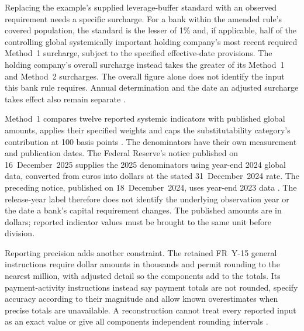 Replacing the example's supplied leverage-buffer standard with an observed
requirement needs a specific surcharge. For a bank within the amended rule's
covered population, the standard is the lesser of 1\% and, if applicable,
half of the controlling global systemically important holding company's most
recent required Method~1 surcharge, subject to the specified effective-date
provisions. The holding company's overall surcharge instead takes the greater
of its Method~1 and Method~2 surcharges. The overall figure alone does not
identify the input this bank rule requires.
Annual determination and the date an adjusted surcharge takes effect also
remain separate
\citep[12~CFR~3.11(a)(1)(v)]{occcapitalpayout2026}
\citep[12~CFR~217.403(a)--(d)]{fedgsibsurcharge2026}.

Method~1 compares twelve reported systemic indicators with published global
amounts, applies their specified weights and caps the substitutability
category's contribution at 100 basis points
\citep[12~CFR~217.404]{fedgsibscore2026}.
The denominators have their own measurement and publication dates. The
Federal Reserve's notice published on 16~December~2025 supplies the 2025
denominators using year-end 2024 global data, converted from euros into
dollars at the stated 31~December~2024 rate. The preceding notice, published
on 18~December~2024, uses year-end 2023 data
\citep[pp.~58245--58246]{fedgsibdenominators2025}
\citep[pp.~102908--102909]{fedgsibdenominators2024}.
The release-year label therefore does not identify the underlying observation
year or the date a bank's capital requirement changes. The published amounts
are in dollars; reported indicator values must be brought to the same unit
before division.

Reporting precision adds another constraint. The retained FR~Y-15 general
instructions require dollar amounts in thousands and permit rounding to the
nearest million, with adjusted detail so the components add to the totals.
Its payment-activity instructions instead say payment totals are not rounded,
specify accuracy according to their magnitude and allow known overestimates
when precise totals are unavailable. A reconstruction cannot treat every
reported input as an exact value or give all components independent rounding
intervals
\citep[GEN-3--4 and C-1; physical pp.~7--8, 25]{fry15instructionsretained2026}.

